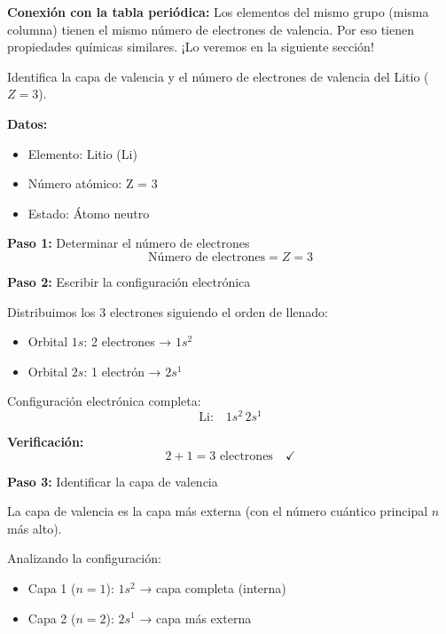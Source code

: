 \begin{remark}
    \textbf{Conexión con la tabla periódica:} Los elementos del mismo grupo (misma columna) tienen el mismo número de electrones de valencia. Por eso tienen propiedades químicas similares. ¡Lo veremos en la siguiente sección!
\end{remark}
\begin{exercise}
    Identifica la capa de valencia y el número de electrones de valencia del Litio (\( Z = 3 \)).
    \begin{solu}
        \textbf{Datos:}
        \begin{itemize}
            \item Elemento: Litio (Li)
            \item Número atómico: Z = 3
            \item Estado: Átomo neutro
        \end{itemize}

        \textbf{Paso 1:} Determinar el número de electrones
        \[
            \text{Número de electrones} = Z = 3
        \]

        \textbf{Paso 2:} Escribir la configuración electrónica

        Distribuimos los 3 electrones siguiendo el orden de llenado:
        \begin{itemize}
            \item Orbital \(1s\): 2 electrones → \(1s^2\)
            \item Orbital \(2s\): 1 electrón → \(2s^1\)
        \end{itemize}

        Configuración electrónica completa:
        \[
            \text{Li:} \quad 1s^2 \, 2s^1
        \]

        \textbf{Verificación:}
        \[
            2 + 1 = 3 \text{ electrones} \quad \checkmark
        \]

        \textbf{Paso 3:} Identificar la capa de valencia

        La capa de valencia es la capa más externa (con el número cuántico principal \(n\) más alto).

        Analizando la configuración:
        \begin{itemize}
            \item Capa 1 (\(n = 1\)): \(1s^2\) → capa completa (interna)
            \item Capa 2 (\(n = 2\)): \(2s^1\) → capa más externa
        \end{itemize}


\end{solu}
\end{exercise}
